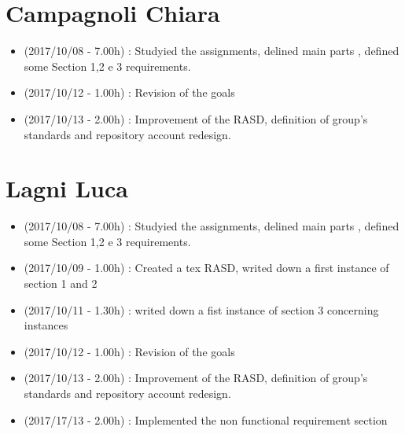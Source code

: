 \documentclass[a4paper]{book}
\begin{document}
\section{Campagnoli Chiara}
\begin{itemize}
\item (2017/10/08 - 7.00h) : Studyied the assignments, delined main parts , defined some Section 1,2 e 3 requirements.
\item (2017/10/12 - 1.00h) : Revision of the goals 
\item (2017/10/13 - 2.00h) : Improvement of the RASD, definition of group's standards and repository account redesign.
\end{itemize}

\section{Lagni Luca}
\begin{itemize}
\item (2017/10/08 - 7.00h) : Studyied the assignments, delined main parts , defined some Section 1,2 e 3 requirements.
\item (2017/10/09 - 1.00h) : Created a tex RASD, writed down a first instance of section 1 and 2
\item (2017/10/11 - 1.30h) : writed down a fist instance of section 3 concerning instances
\item (2017/10/12 - 1.00h) : Revision of the goals 
\item (2017/10/13 - 2.00h) : Improvement of the RASD, definition of group's standards and repository account redesign.
\item (2017/17/13 - 2.00h) : Implemented the non functional requirement section
\end{itemize}
\end{document}
